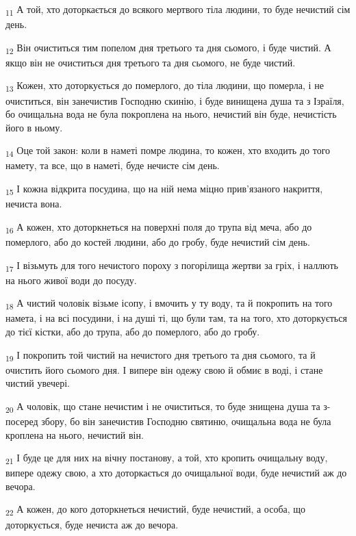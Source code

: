 \begin{tcolorbox}
\textsubscript{11} А той, хто доторкається до всякого мертвого тіла людини, то буде нечистий сім день.
\end{tcolorbox}
\begin{tcolorbox}
\textsubscript{12} Він очиститься тим попелом дня третього та дня сьомого, і буде чистий. А якщо він не очиститься дня третього та дня сьомого, не буде чистий.
\end{tcolorbox}
\begin{tcolorbox}
\textsubscript{13} Кожен, хто доторкується до померлого, до тіла людини, що померла, і не очиститься, він занечистив Господню скинію, і буде винищена душа та з Ізраїля, бо очищальна вода не була покроплена на нього, нечистий він буде, нечистість його в ньому.
\end{tcolorbox}
\begin{tcolorbox}
\textsubscript{14} Оце той закон: коли в наметі помре людина, то кожен, хто входить до того намету, та все, що в наметі, буде нечисте сім день.
\end{tcolorbox}
\begin{tcolorbox}
\textsubscript{15} І кожна відкрита посудина, що на ній нема міцно прив'язаного накриття, нечиста вона.
\end{tcolorbox}
\begin{tcolorbox}
\textsubscript{16} А кожен, хто доторкнеться на поверхні поля до трупа від меча, або до померлого, або до костей людини, або до гробу, буде нечистий сім день.
\end{tcolorbox}
\begin{tcolorbox}
\textsubscript{17} І візьмуть для того нечистого пороху з погорілища жертви за гріх, і наллють на нього живої води до посуду.
\end{tcolorbox}
\begin{tcolorbox}
\textsubscript{18} А чистий чоловік візьме ісопу, і вмочить у ту воду, та й покропить на того намета, і на всі посудини, і на душі ті, що були там, та на того, хто доторкується до тієї кістки, або до трупа, або до померлого, або до гробу.
\end{tcolorbox}
\begin{tcolorbox}
\textsubscript{19} І покропить той чистий на нечистого дня третього та дня сьомого, та й очистить його сьомого дня. І випере він одежу свою й обмиє в воді, і стане чистий увечері.
\end{tcolorbox}
\begin{tcolorbox}
\textsubscript{20} А чоловік, що стане нечистим і не очиститься, то буде знищена душа та з-посеред збору, бо він занечистив Господню святиню, очищальна вода не була кроплена на нього, нечистий він.
\end{tcolorbox}
\begin{tcolorbox}
\textsubscript{21} І буде це для них на вічну постанову, а той, хто кропить очищальну воду, випере одежу свою, а хто доторкається до очищальної води, буде нечистий аж до вечора.
\end{tcolorbox}
\begin{tcolorbox}
\textsubscript{22} А кожен, до кого доторкнеться нечистий, буде нечистий, а особа, що доторкується, буде нечиста аж до вечора.
\end{tcolorbox}
